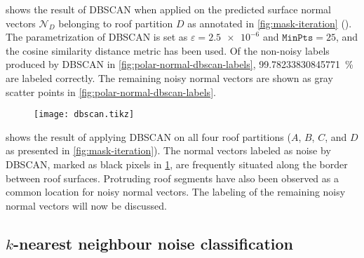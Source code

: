  shows the result of DBSCAN when applied on the predicted surface normal vectors $\mathcal{N}_D$ belonging to roof partition $D$ as annotated in \cref{fig:mask-iteration} ().
The parametrization of DBSCAN is set as $\varepsilon = \num{2.5e-6}$ and $\texttt{MinPts} = 25$, and the cosine similarity distance metric has been used.
Of the non-noisy labels produced by DBSCAN in \cref{fig:polar-normal-dbscan-labels}, \SI[round-mode=places,round-precision=1]{99.78233830845771}{\percent} are labeled correctly.
The remaining noisy normal vectors are shown as gray scatter points in \cref{fig:polar-normal-dbscan-labels}.
\begin{figure}[H]
  \centering
  \texttt{[image: dbscan.tikz]}
  \label{fig:dbscan-tile}
\end{figure}
\noindent
{} shows the result of applying DBSCAN on all four roof partitions ($A$, $B$, $C$, and $D$ as presented in \cref{fig:mask-iteration}).
The normal vectors labeled as noise by DBSCAN, marked as black pixels in \cref{fig:dbscan-tile}, are frequently situated along the border between roof surfaces.
Protruding roof segments have also been observed as a common location for noisy normal vectors.
The labeling of the remaining noisy normal vectors will now be discussed.

\subsection{\texorpdfstring{$k$}{k}-nearest neighbour noise classification}

